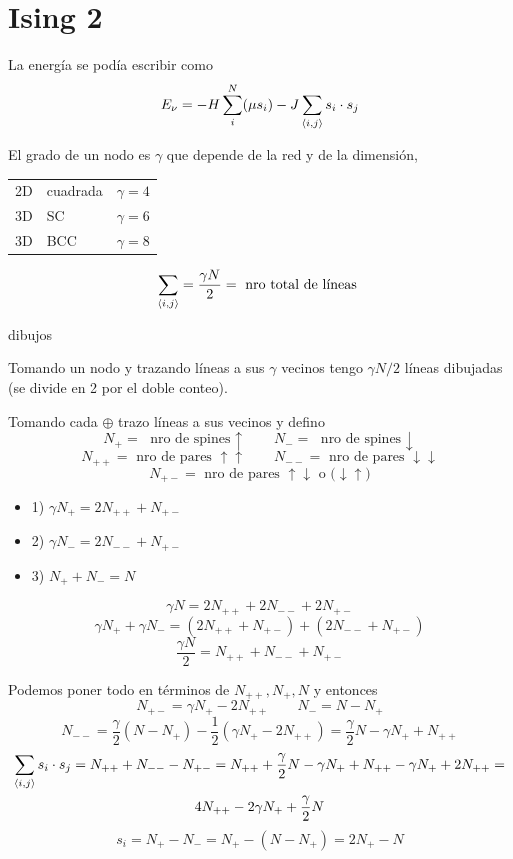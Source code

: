 \documentclass[10pt,oneside]{CBFT_book}
\begin{document}
\section{Ising 2}

La energía se podía escribir como
\[
	E_\nu = - H \sum_i^N (\mu s_i) - J \sum_{\braket{i,j}} s_i \cdot s_j 
\]

El grado de un nodo es $\gamma$ que depende de la red y de la dimensión,
\begin{center}
\begin{tabular}{lll}
2D & cuadrada & $\gamma=4$ \\
3D & SC & $\gamma=6$ \\
3D & BCC & $\gamma=8$
\end{tabular}
\end{center}


\[ 
	\sum_{\braket{i,j}} = \frac{\gamma N}{2} = \text{ nro total de líneas } 
\]

dibujos

Tomando un nodo y trazando líneas a sus $\gamma$ vecinos tengo $ \gamma N/2 $ líneas dibujadas
(se divide en 2 por el doble conteo).

Tomando cada $\oplus$ trazo líneas a sus vecinos y defino
\[ 
	N_+ = \text{ nro de spines $\uparrow$} \qquad N_- = \text{ nro de spines $\downarrow$}
\]
\[ 
	N_{++} = \text{ nro de pares $\uparrow\uparrow$} \qquad 
	N_{--} = \text{ nro de pares $\downarrow\downarrow$}
\]
\[ 
	N_{+-} = \text{ nro de pares $\uparrow\downarrow$ o ($\downarrow\uparrow$)}
\]
\begin{itemize}
 \item 1) $ \gamma N_+ = 2N_{++} + N_{+-} $
 \item 2) $ \gamma N_- = 2N_{--} + N_{+-} $
 \item 3) $ N_+ + N_- = N $
\end{itemize}

\[
	\gamma N = 2N_{++} + 2N_{--} + 2N_{+-}
\]
\[
	\gamma N_+ + \gamma N_- = (2N_{++} + N_{+-}) + (2N_{--} + N_{+-})
\]
\[
	\frac{\gamma N}{2} = N_{++} + N_{--} + N_{+-} 
\]

Podemos poner todo en términos de $N_{++}, N_+, N$ y entonces
\[
	N_{+-} = \gamma N_+ - 2N_{++} \qquad N_- = N - N_+
\]
\[
	N_{--} = \frac{\gamma}{2}(N-N_+) - \frac{1}{2}(\gamma N_+ - 2N_{++}) =
	\frac{\gamma}{2} N - \gamma N_+ + N_{++}
\]
\begin{multline*}
	\sum_{\braket{i,j}} s_i \cdot s_j = N_{++} + N_{--} - N_{+-} =
	N_{++} + \frac{\gamma}{2}N - \gamma N_+ + N_{++} - \gamma N_+ + 2N_{++}= \\
	4N_{++} - 2\gamma N_+ + \frac{\gamma}{2}N 
\end{multline*}
\[
	s_i = N_+ - N_- = N_+ - (N-N_+) = 2N_+ - N
\]
\end{document}
